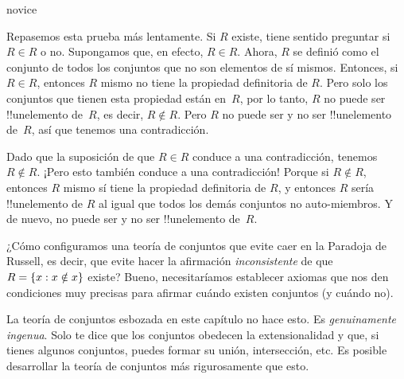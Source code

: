 \documentclass[../../../include/open-logic-section]{subfiles}
\begin{document}
\begin{tagblock}{novice}
\begin{explain}
Repasemos esta prueba más lentamente. Si $R$ existe, tiene sentido preguntar si $R \in
R$ o no. Supongamos que, en efecto, $R \in R$. Ahora, $R$ se definió como el conjunto de todos los
conjuntos que no son elementos de sí mismos. Entonces, si $R \in R$, entonces $R$ mismo no tiene la propiedad definitoria de $R$. Pero solo los conjuntos que tienen esta propiedad están en~$R$, por lo tanto, $R$ no puede ser !!un{elemento} de~$R$, es decir, $R \notin R$. Pero $R$ no puede ser y no ser !!un{elemento} de~$R$, así que tenemos una contradicción.

Dado que la suposición de que $R \in R$ conduce a una contradicción, tenemos $R \notin R$. ¡Pero esto también conduce a una contradicción!{} Porque si $R \notin R$, entonces $R$ mismo sí tiene la propiedad definitoria de $R$, y entonces $R$ sería !!un{elemento} de $R$ al igual que todos los demás conjuntos no auto-miembros. Y de nuevo, no puede ser y no ser !!un{elemento} de~$R$.
\end{explain}
\end{tagblock}

\begin{digress}
¿Cómo configuramos una teoría de conjuntos que evite caer en
la Paradoja de Russell, es decir, que evite hacer la afirmación
\emph{inconsistente} de que $R = \{ x : x \notin x \}$ existe? Bueno, necesitaríamos establecer axiomas que nos den condiciones muy precisas para afirmar cuándo
existen conjuntos (y cuándo no).
	
La teoría de conjuntos esbozada en este capítulo no hace esto. Es
\emph{genuinamente ingenua}. Solo te dice que los conjuntos obedecen la extensionalidad y que, si tienes algunos conjuntos, puedes formar su unión, intersección, etc. Es posible desarrollar la teoría de conjuntos más rigurosamente que esto. 
\end{digress}
\end{document}
